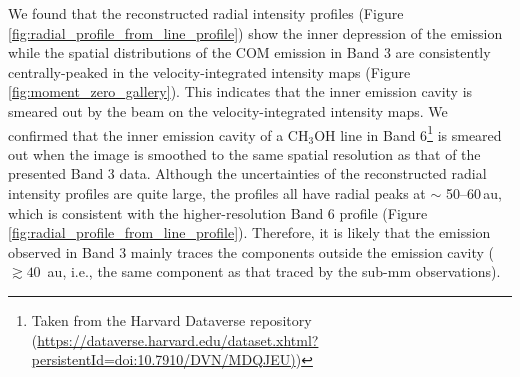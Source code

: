 \documentclass[linenumbers, twocolumn, twocolappendix, astrosymb, times]{aastex631}
\newcommand{\methanol}{CH$_3$OH\xspace}
\begin{document}
We found that the reconstructed radial intensity profiles (Figure \ref{fig:radial_profile_from_line_profile}) show the inner depression of the emission while the spatial distributions of the COM emission in Band 3 are consistently centrally-peaked in the velocity-integrated intensity maps (Figure \ref{fig:moment_zero_gallery}). This indicates that the inner emission cavity is smeared out by the beam on the velocity-integrated intensity maps. We confirmed that the inner emission cavity of a \methanol line in Band 6\footnote{Taken from the Harvard Dataverse repository (\url{https://dataverse.harvard.edu/dataset.xhtml?persistentId=doi:10.7910/DVN/MDQJEU)})} \citep{Tobin2023} is smeared out when the image is smoothed to the same spatial resolution as that of the presented Band 3 data.
Although the uncertainties of the reconstructed radial intensity profiles are quite large, the profiles all have radial peaks at $\sim$ 50--60\,au, which is consistent with the higher-resolution Band 6 profile (Figure \ref{fig:radial_profile_from_line_profile}). Therefore, it is likely that the emission observed in Band 3 mainly traces the components outside the emission cavity ($\gtrsim 40\,$ au, i.e., the same component as that traced by the sub-mm observations). 
\end{document}
